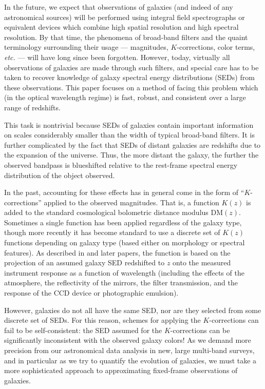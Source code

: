 \documentclass[10pt,preprint]{aastex}
\begin{document}
In the future, we expect that observations of galaxies (and indeed of
any astronomical sources) will be performed using integral field
spectrographs or equivalent devices which combine high spatial
resolution and high spectral resolution. By that time, the phenomena
of broad-band filters and the quaint terminology surrounding their
usage --- magnitudes, $K$-corrections, color terms, {\it etc.} ---
will have long since been forgotten. However, today, virtually all
observations of galaxies are made through such filters, and special
care has to be taken to recover knowledge of galaxy spectral energy
distributions (SEDs) from these observations. This paper focuses on a
method of facing this problem which (in the optical wavelength regime)
is fast, robust, and consistent over a large range of redshifts.

This task is nontrivial because SEDs of galaxies contain important
information on scales considerably smaller than the width of typical
broad-band filters. It is further complicated by the fact that SEDs of
distant galaxies are redshifts due to the expansion of the
universe. Thus, the more distant the galaxy, the further the observed
bandpass is blueshifted relative to the rest-frame spectral energy
distribution of the object observed. 

In the past, accounting for these effects has in general come in the
form of ``$K$-corrections'' applied to the observed magnitudes. That
is, a function $K(z)$ is added to the standard cosmological bolometric
distance modulus $\mathrm{DM}(z)$. Sometimes a single function has
been applied regardless of the galaxy type, though more recently it
has become standard to use a discrete set of $K(z)$ functions
depending on galaxy type (based either on morphology or spectral
features). As described in \cite{oke68a} and later papers, the
function is based on the projection of an assumed galaxy SED
redshifted to $z$ onto the measured instrument response as a function
of wavelength (including the effects of the atmosphere, the
reflectivity of the mirrors, the filter transmission, and the response
of the CCD device or photographic emulsion).

However, galaxies do not all have the same SED, nor are they selected
from some discrete set of SEDs. For this reason, schemes for applying
the $K$-corrections can fail to be self-consistent: the SED assumed
for the $K$-corrections can be significantly inconsistent with the
observed galaxy colors! As we demand more precision from our
astronomical data analysis in new, large multi-band surveys, and in
particular as we try to quantify the evolution of galaxies, we must
take a more sophisticated approach to approximating fixed-frame
observations of galaxies.
\end{document}

